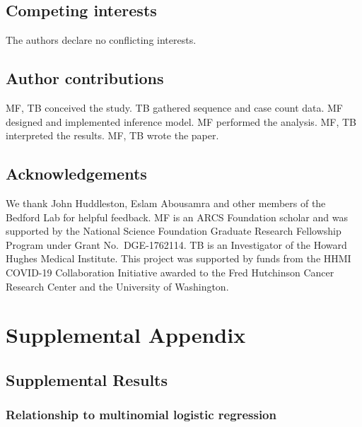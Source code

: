 \documentclass[11pt,oneside,letterpaper]{article}
\begin{document}
\subsection*{Competing interests}%

The authors declare no conflicting interests.

\subsection*{Author contributions}

MF, TB conceived the study.
TB gathered sequence and case count data.
MF designed and implemented inference model.
MF performed the analysis.
MF, TB interpreted the results.
MF, TB wrote the paper.

\subsection*{Acknowledgements}%

We thank John Huddleston, Eslam Abousamra and other members of the Bedford Lab for helpful feedback.
MF is an ARCS Foundation scholar and was supported by the National Science Foundation Graduate Research Fellowship Program under Grant No.\ DGE-1762114.
TB is an Investigator of the Howard Hughes Medical Institute.
This project was supported by funds from the HHMI COVID-19 Collaboration Initiative awarded to the Fred Hutchinson Cancer Research Center and the University of Washington.




\newpage

\appendix

\setcounter{figure}{0}
\setcounter{table}{0}
\setcounter{page}{1}
\renewcommand{\thefigure}{S\arabic{figure}}
\renewcommand{\thetable}{S\arabic{table}}
\renewcommand{\thepage}{S\arabic{page}}

\section*{Supplemental Appendix}

\subsection*{Supplemental Results}

\subsubsection*{Relationship to multinomial logistic regression}
\end{document}
